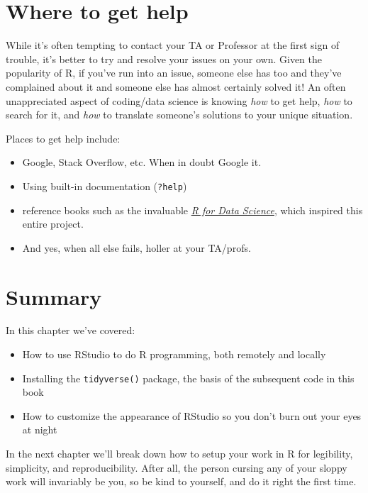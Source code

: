 \documentclass[
]{book}
\providecommand{\tightlist}{%
  \setlength{\itemsep}{0pt}\setlength{\parskip}{0pt}}
\begin{document}
\hypertarget{where-to-get-help}{%
\section{Where to get help}\label{where-to-get-help}}

While it's often tempting to contact your TA or Professor at the first sign of trouble, it's better to try and resolve your issues on your own. Given the popularity of R, if you've run into an issue, someone else has too and they've complained about it and someone else has almost certainly solved it! An often unappreciated aspect of coding/data science is knowing \emph{how} to get help, \emph{how} to search for it, and \emph{how} to translate someone's solutions to your unique situation.

Places to get help include:

\begin{itemize}
\tightlist
\item
  Google, Stack Overflow, etc. When in doubt Google it.
\item
  Using built-in documentation (\texttt{?help})
\item
  reference books such as the invaluable \href{https://r4ds.had.co.nz/index.html}{\emph{R for Data Science}}, which inspired this entire project.
\item
  And yes, when all else fails, holler at your TA/profs.
\end{itemize}

\hypertarget{summary}{%
\section{Summary}\label{summary}}

In this chapter we've covered:

\begin{itemize}
\tightlist
\item
  How to use RStudio to do R programming, both remotely and locally
\item
  Installing the \texttt{tidyverse()} package, the basis of the subsequent code in this book
\item
  How to customize the appearance of RStudio so you don't burn out your eyes at night
\end{itemize}

In the next chapter we'll break down how to setup your work in R for legibility, simplicity, and reproducibility. After all, the person cursing any of your sloppy work will invariably be you, so be kind to yourself, and do it right the first time.
\end{document}
